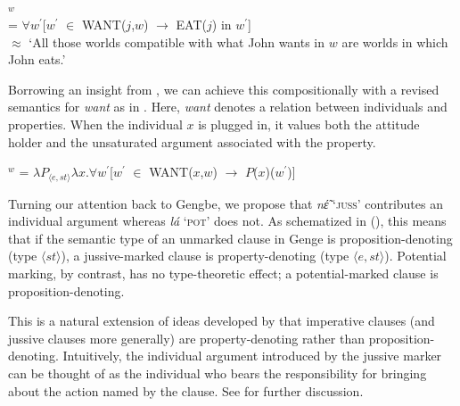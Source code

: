 \documentclass[output=paper,modfonts,nonflat]{langsci/langscibook}
\newcommand{\á}{\'{ã}}
\newcommand{\É}{\'{\~{ε}}}
\newcommand{\È}{\`{\~{ε}}}
\newcommand{\í}{\'{\~{i}}}
\newcommand{\ì}{\`{\~{i}}}
\newcommand{\Ó}{\'{\~{ɔ}}}
\newcommand{\Ò}{\`{\~{ɔ}}}
\newcommand{\ú}{\'{ũ}}
\newcommand{\ù}{\`{ũ}}
\begin{document}
\ea 
{}$^{w}$\\  = $\forall w^{\prime}$[$w^{\prime}$ $\in$ WANT($j$,$w$) $\rightarrow$ EAT($j$) in $w^{\prime}$]\\
$\approx$ `All those worlds compatible with what John wants in $w$ are worlds in which John eats.' \label{ex:grano:wcs:24}
\z

Borrowing an insight from \cite{Chierchi1984, Dowty1985}, we can achieve this compositionally with a revised semantics for \emph{want} as in . Here, \emph{want} denotes a relation between individuals and properties. When the individual $x$ is plugged in, it values both the attitude holder and the unsaturated argument associated with the property.

\ea
{}$^{w}$ = $\lambda P_{\langle  e, st\rangle}\lambda x.\forall w^{\prime}$[$w^{\prime}$ $\in$ WANT($x$,$w$) $\rightarrow$ $P$($x$)($w^{\prime}$)] \label{ex:grano:w2:25}
\z

Turning our attention back to Gengbe, we propose that \emph{n{\É}} `\textsc{juss}' contributes an individual argument whereas \emph{l\'a} `\textsc{pot}' does not. As schematized in (), this means that if the semantic type of an unmarked clause in Genge is proposition-denoting (type $\langle st\rangle$), a jussive-marked clause is property-denoting (type $\langle e,st\rangle$). Potential marking, by contrast, has no type-theoretic effect; a potential-marked clause is proposition-denoting. 


\ea \label{ex:grano:mm:26}
    \begin{xlist}
    \end{xlist}
\z

This is a natural extension of ideas developed by \cite{Portner2004, Portner2007, Zanuttini2012} that imperative clauses (and jussive clauses more generally) are property-denoting rather than proposition-denoting. Intuitively, the individual argument introduced by the jussive marker can be thought of as the individual who bears the responsibility for bringing about the action named by the clause.  See \citealt{GranoToappear} for further discussion.


\end{document}
